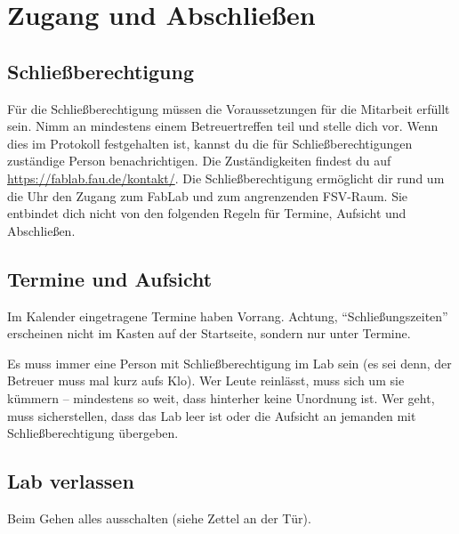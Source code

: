 \documentclass{\basedir/fablab-document}
\begin{document}
\section{Zugang und Abschließen}
\subsection{Schließberechtigung}
Für die Schließberechtigung müssen die Voraussetzungen für die Mitarbeit erfüllt sein.
Nimm an mindestens einem Betreuertreffen teil und stelle dich vor.
Wenn dies im Protokoll festgehalten ist, kannst du die für Schließberechtigungen zuständige Person
benachrichtigen. Die Zuständigkeiten findest du auf \url{https://fablab.fau.de/kontakt/}.
Die Schließberechtigung ermöglicht dir rund um die Uhr den Zugang zum FabLab und zum angrenzenden
FSV-Raum. Sie entbindet dich nicht von den folgenden Regeln für Termine, Aufsicht und Abschließen.

\subsection{Termine und Aufsicht}
Im Kalender eingetragene Termine haben Vorrang. Achtung, \enquote{Schließungszeiten} erscheinen nicht im Kasten auf der Startseite, sondern nur unter Termine.

Es muss immer eine Person mit Schließberechtigung im Lab sein (es sei denn, der Betreuer muss mal kurz aufs Klo). Wer Leute reinlässt, muss sich um sie kümmern -- mindestens so weit, dass hinterher keine Unordnung ist. Wer geht, muss sicherstellen, dass das Lab leer ist oder die Aufsicht an jemanden mit Schließberechtigung übergeben.

\subsection{Lab verlassen}
Beim Gehen alles ausschalten (siehe Zettel an der Tür).
\end{document}
